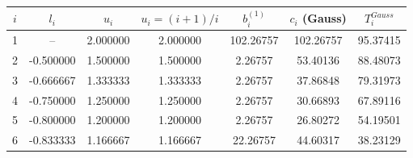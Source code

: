 \begin{tabular}{c ccc ccc}
\toprule
$i$ & $l_i$ & $u_i$ & $u_i=(i+1)/i$ & $b^{(1)}_i$ & $c_i$ (Gauss) & $T_i^{Gauss}$\\
\midrule
1 & -- & 2.000000 & 2.000000 & 102.26757 & 102.26757 & 95.37415\\
2 & -0.500000 & 1.500000 & 1.500000 & 2.26757 & 53.40136 & 88.48073\\
3 & -0.666667 & 1.333333 & 1.333333 & 2.26757 & 37.86848 & 79.31973\\
4 & -0.750000 & 1.250000 & 1.250000 & 2.26757 & 30.66893 & 67.89116\\
5 & -0.800000 & 1.200000 & 1.200000 & 2.26757 & 26.80272 & 54.19501\\
6 & -0.833333 & 1.166667 & 1.166667 & 22.26757 & 44.60317 & 38.23129\\
\bottomrule
\end{tabular}

